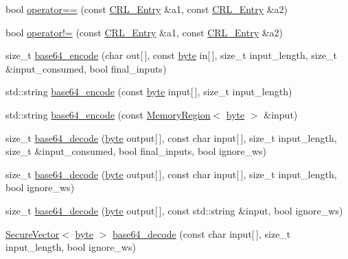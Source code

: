 \begin{DoxyCompactItemize}
\item 
bool \hyperlink{namespaceBotan_a78d3ce4a7d2d0cd089d1107316e59ccd}{operator==} (const \hyperlink{classBotan_1_1CRL__Entry}{C\-R\-L\-\_\-\-Entry} \&a1, const \hyperlink{classBotan_1_1CRL__Entry}{C\-R\-L\-\_\-\-Entry} \&a2)
\item 
bool \hyperlink{namespaceBotan_ad114867ad908a4db8b52472a39ead7ef}{operator!=} (const \hyperlink{classBotan_1_1CRL__Entry}{C\-R\-L\-\_\-\-Entry} \&a1, const \hyperlink{classBotan_1_1CRL__Entry}{C\-R\-L\-\_\-\-Entry} \&a2)
\item 
size\-\_\-t \hyperlink{namespaceBotan_aae1b2b697c4eecd0997216046c7dc744}{base64\-\_\-encode} (char out\mbox{[}$\,$\mbox{]}, const \hyperlink{namespaceBotan_a7d793989d801281df48c6b19616b8b84}{byte} in\mbox{[}$\,$\mbox{]}, size\-\_\-t input\-\_\-length, size\-\_\-t \&input\-\_\-consumed, bool final\-\_\-inputs)
\item 
std\-::string \hyperlink{namespaceBotan_a0dd24063a031ed438e778f160ec3fba7}{base64\-\_\-encode} (const \hyperlink{namespaceBotan_a7d793989d801281df48c6b19616b8b84}{byte} input\mbox{[}$\,$\mbox{]}, size\-\_\-t input\-\_\-length)
\item 
std\-::string \hyperlink{namespaceBotan_ad5126d1461e5d5153eba8aaab802e287}{base64\-\_\-encode} (const \hyperlink{classBotan_1_1MemoryRegion}{Memory\-Region}$<$ \hyperlink{namespaceBotan_a7d793989d801281df48c6b19616b8b84}{byte} $>$ \&input)
\item 
size\-\_\-t \hyperlink{namespaceBotan_ac41bd7c34c5a7c23c56bf19e9ed0b518}{base64\-\_\-decode} (\hyperlink{namespaceBotan_a7d793989d801281df48c6b19616b8b84}{byte} output\mbox{[}$\,$\mbox{]}, const char input\mbox{[}$\,$\mbox{]}, size\-\_\-t input\-\_\-length, size\-\_\-t \&input\-\_\-consumed, bool final\-\_\-inputs, bool ignore\-\_\-ws)
\item 
size\-\_\-t \hyperlink{namespaceBotan_a80e469b706ae290bde2fe3e03390cd83}{base64\-\_\-decode} (\hyperlink{namespaceBotan_a7d793989d801281df48c6b19616b8b84}{byte} output\mbox{[}$\,$\mbox{]}, const char input\mbox{[}$\,$\mbox{]}, size\-\_\-t input\-\_\-length, bool ignore\-\_\-ws)
\item 
size\-\_\-t \hyperlink{namespaceBotan_a0261160daa73fab3e34f08103ab1a5eb}{base64\-\_\-decode} (\hyperlink{namespaceBotan_a7d793989d801281df48c6b19616b8b84}{byte} output\mbox{[}$\,$\mbox{]}, const std\-::string \&input, bool ignore\-\_\-ws)
\item 
\hyperlink{classBotan_1_1SecureVector}{Secure\-Vector}$<$ \hyperlink{namespaceBotan_a7d793989d801281df48c6b19616b8b84}{byte} $>$ \hyperlink{namespaceBotan_af22969b22530f6ce6d8950fa48173eca}{base64\-\_\-decode} (const char input\mbox{[}$\,$\mbox{]}, size\-\_\-t input\-\_\-length, bool ignore\-\_\-ws)

\end{DoxyCompactItemize}
